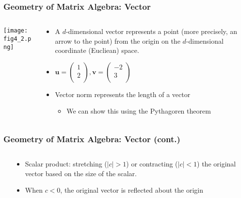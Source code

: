 \documentclass[pdflatex, 12pt]{beamer}
\begin{document}
\begin{frame}
\frametitle{Geometry of Matrix Algebra: Vector}
\begin{columns}
\begin{column}{0.5\textwidth}
\centering
\texttt{[image: fig4\_2.png]}
\end{column}
\begin{column}{0.5\textwidth}
\begin{itemize}
\item A $d$-dimensional vector represents a point (more precisely, an arrow to the point) from the origin on the $d$-dimensional coordinate (Eucliean) space.
\vspace{0.4cm}
\item $\bm{u} = \begin{pmatrix}
1 \\
2 \\
\end{pmatrix}, \bm{v} = \begin{pmatrix}
-2 \\
3 \\
\end{pmatrix}$
\vspace{0.4cm}
\item Vector norm represents the length of a vector
 \begin{itemize}
 \item We can show this using the Pythagoren theorem
 \end{itemize}
\end{itemize}
\end{column}
\end{columns}
\end{frame}

\begin{frame}
\frametitle{Geometry of Matrix Algebra: Vector (cont.)}
\begin{columns}
\begin{column}{0.5\textwidth}
\centering
{}
\end{column}
\begin{column}{0.5\textwidth}
\begin{itemize}
\item Scalar product: stretching ($|c| > 1$) or contracting ($|c| < 1$) the original vector based on the size of the scalar.
\vspace{0.4cm}
\item When $c < 0$, the original vector is reflected about the origin
\end{itemize}
\end{column}
\end{columns}
\end{frame}
\end{document}
